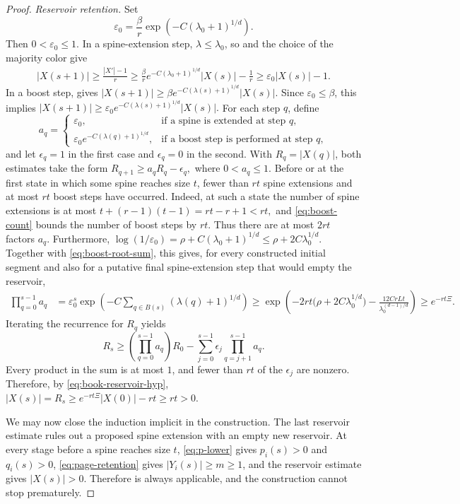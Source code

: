 \documentclass[twoside,12pt]{article}
\theoremstyle{definition}
\theoremstyle{remark}
\newcommand{\1}{\mathbf 1}
\begin{document}
\begin{proof}
\medskip
\noindent\emph{Reservoir retention.}
Set
\[
 \varepsilon_0=\frac\beta r
 \exp\!\left(-C(\lambda_0+1)^{1/d}\right).
\]
Then $0<\varepsilon_0\le1$. In a spine-extension step,
$\lambda\le\lambda_0$, so  and the choice of the majority
color give
\begin{align*}
 |X(s+1)|
 \ge\frac{|X'|-1}{r}\ge\frac\beta r
       e^{-C(\lambda_0+1)^{1/d}}|X(s)|-\frac1r\ge\varepsilon_0|X(s)|-1.
\end{align*}
In a boost step,  gives
$
 |X(s+1)|
 \ge\beta e^{-C(\lambda(s)+1)^{1/d}}|X(s)|.
$
Since $\varepsilon_0\le\beta$, this implies
$
 |X(s+1)|
\ge\varepsilon_0e^{-C(\lambda(s)+1)^{1/d}}|X(s)|.
$
For each step $q$, define
\[
 a_q=
 \begin{cases}
  \varepsilon_0,&\text{if a spine is extended at step $q$},\\
  \varepsilon_0e^{-C(\lambda(q)+1)^{1/d}},
  &\text{if a boost step is performed at step $q$},
 \end{cases}
\]
and let $\epsilon_q=1$ in the first case and $\epsilon_q=0$ in the second.
With $R_q=|X(q)|$, both estimates take the form
$
 R_{q+1}\ge a_qR_q-\epsilon_q,$ where $
 0<a_q\le1.
$
Before or at the first state in which some spine reaches size $t$, fewer than
$rt$ spine extensions and at most $rt$ boost steps have occurred. Indeed, at
such a state the number of spine extensions is at most
$
 t+(r-1)(t-1)=rt-r+1<rt,
$
and \eqref{eq:boost-count} bounds the number of boost steps by $rt$. Thus
there are at most $2rt$ factors $a_q$. Furthermore,
$\log(1/\varepsilon_0)
=\rho+C(\lambda_0+1)^{1/d}
\le\rho+2C\lambda_0^{1/d}.
$
Together with \eqref{eq:boost-root-sum}, this gives, for every constructed
initial segment and also for a putative final spine-extension step that would
empty the reservoir,
\begin{align*}
 \prod_{q=0}^{s-1}a_q
 &=\varepsilon_0^s
 \exp\!\left(-C\sum_{q\in B(s)}(\lambda(q)+1)^{1/d}\right)\ge\exp\!\left(
-2rt\bigl(\rho+2C\lambda_0^{1/d}\bigr)
 -\frac{12CrLt}{\lambda_0^{(d-1)/d}}
 \right)\ge e^{-rt\Xi}.
\end{align*}
Iterating the recurrence for $R_q$ yields
\[
 R_s\ge
 \left(\prod_{q=0}^{s-1}a_q\right)R_0
 -\sum_{j=0}^{s-1}\epsilon_j
  \prod_{q=j+1}^{s-1}a_q.
\]
Every product in the sum is at most $1$, and fewer than $rt$ of the
$\epsilon_j$ are nonzero. Therefore, by
\eqref{eq:book-reservoir-hyp},
$
 |X(s)|=R_s
 \ge e^{-rt\Xi}|X(0)|-rt
 \ge rt>0.
$

We may now close the induction implicit in the construction. The last
reservoir estimate rules out a proposed spine extension with an empty new
reservoir. At every stage before a spine reaches size $t$,
\eqref{eq:p-lower} gives $p_i(s)>0$ and $q_i(s)>0$,
\eqref{eq:page-retention} gives $|Y_i(s)|\ge m\ge1$, and the reservoir
estimate gives $|X(s)|>0$. Therefore  is always applicable,
and the construction cannot stop prematurely.


\end{proof}
\end{document}
